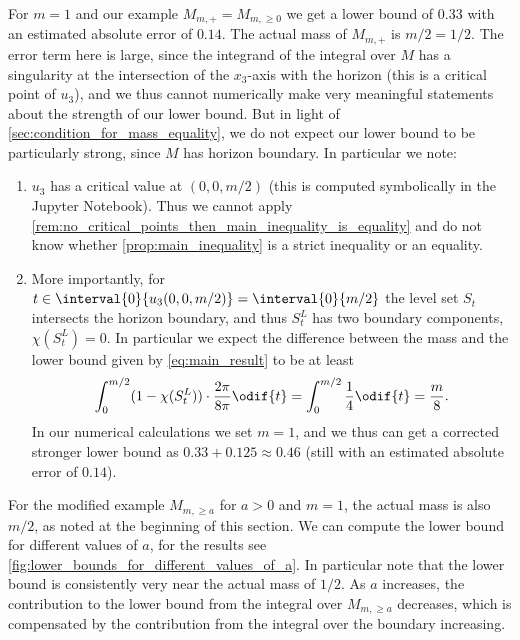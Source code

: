 \documentclass[titlepage,numbers=noenddot,oneside,%
cleardoublepage=empty,paper=a4,fontsize=11pt,%
english,%
]{scrartcl}
\begin{document}
For \( m=1 \) and our example \( M_{m,+}=M_{m,\geq 0} \) we get a lower bound of \( 0.33 \) with an estimated absolute error of \( 0.14 \). The actual mass of \( M_{m,+} \) is \( m/2=1/2 \). The error term here is large, since the integrand of the integral over \( M \) has a singularity at the intersection of the \( x_3 \)-axis with the horizon (this is a critical point of \( u_3 \)), and we thus cannot numerically make very meaningful statements about the strength of our lower bound. But in light of \cref{sec:condition_for_mass_equality}, we do not expect our lower bound to be particularly strong, since \( M \) has horizon boundary. In particular we note:
\begin{enumerate}
    \item \( u_3 \) has a critical value at \( (0,0,m/2) \) (this is computed symbolically in the Jupyter Notebook). Thus we cannot apply \cref{rem:no_critical_points_then_main_inequality_is_equality} and do not know whether \cref{prop:main_inequality} is a strict inequality or an equality.
    \item More importantly, for \( t\in \interval{0}{u_3(0,0,m/2)}=\interval{0}{m/2} \) the level set \( S_t \) intersects the horizon boundary, and thus \( S_t^L \) has two boundary components, \ie \( \chi(S_t^L)=0 \). In particular we expect the difference between the mass and the lower bound given by \cref{eq:main_result} to be at least
    \begin{equation*}
        \int_{0}^{m/2}(1-\chi(S_t^L))\cdot \frac{2\pi}{8\pi} \odif{t}=\int_0^{m/2}\frac{1}{4}\odif{t}=\frac{m}{8}.
    \end{equation*}
    In our numerical calculations we set \( m=1 \), and we thus can get a corrected stronger lower bound as \( 0.33+0.125\approx 0.46 \) (still with an estimated absolute error of \( 0.14 \)).
\end{enumerate}

For the modified example \( M_{m,\geq a} \) for \( a>0 \) and \( m=1 \), the actual mass is also \( m/2 \), as noted at the beginning of this section. We can compute the lower bound for different values of \( a \), for the results see \cref{fig:lower_bounds_for_different_values_of_a}. In particular note that the lower bound is consistently very near the actual mass of \( 1/2 \). As \( a \) increases, the contribution to the lower bound from the integral over \( M_{m,\geq a} \) decreases, which is compensated by the contribution from the integral over the boundary increasing. 
\end{document}

